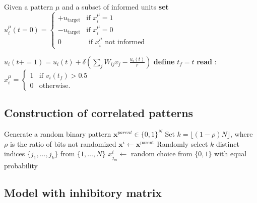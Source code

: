 \documentclass[10pt,letterpaper]{article}
\begin{document}
\begin{algorithm}[h]
\caption{Querying with convergence of the network using Euler method}
\begin{algorithmic}[1]
\State Given a pattern $\mu$ and a subset of informed units
\State \textbf{set}
        \(
        u_i^{\mu}(t=0) = 
        \begin{cases}  
        +u_{\text{target}}  & \text{if $x_i^\mu = 1$} \\
        -u_{\text{target}} & \text{if $x_i^\mu = 0$} \\
        0 & \text{ if $x_i^\mu$ not informed}
        \end{cases}\)
        
\Repeat
    \State $u_i(t += 1)= u_i(t)+ \delta(\sum_j W_{ij}v_j - \frac{u_i(t)}{r})$
    \EndFor
{}
\State \textbf{define} $t_f = t$ 
\State \textbf{read} :
\(
x^{\mu}_i = 
\begin{cases} 
1 & \text{if } v_i(t_f)>0.5 \\
0 & \text{otherwise.}
\end{cases}
\)
\end{algorithmic} \label{alg:querying_continuous}
\end{algorithm}

\subsection{Construction of correlated patterns}
\label{app:correlated_patterns}

\begin{algorithm}[H]
\caption{Generation of $p$ correlated random patterns}
\begin{algorithmic}[1]
\State Generate a random binary pattern $\textbf{x}^{parent} \in \{0,1\}^N$
\State Set $k = \lfloor (1-\rho)N \rfloor$, where $\rho$ is the ratio of bits not randomized
    \State $\textbf{x}^i \gets \mathbf{x}^{\text{parent}}$
    \State Randomly select $k$ distinct indices $\{j_1,\ldots, j_k\}$ from $\{1,\ldots, N\}$
        \State $x^i_{j_m} \gets$ random choice from $\{0,1\}$ with equal probability
    \EndFor
\EndFor
\end{algorithmic}
\label{alg:correlated_patterns}
\end{algorithm}

\subsection{Model with inhibitory matrix}
\label{app:inhib_matrix}
\end{document}

